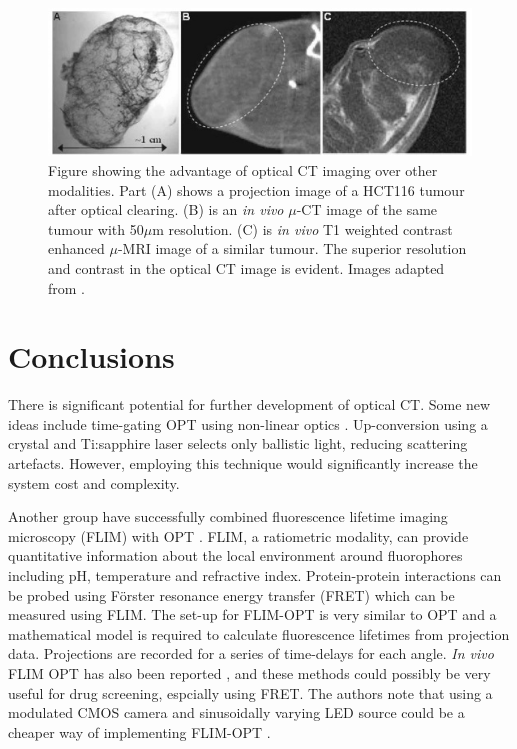 	
	
	\begin{figure}[H]
		\centering
		\includegraphics[scale=1]{intro_img/Oldham_2006_tumourstaining.jpg}
		\caption{Figure showing the advantage of optical CT imaging over other modalities. Part (A) shows a projection image of a HCT116 tumour after optical clearing. (B) is an \textit{in vivo} $\mu$-CT image of the same tumour with 50$\mu$m resolution. (C) is \textit{in vivo} T1 weighted contrast enhanced $\mu$-MRI image of a similar tumour. The superior resolution and contrast in the optical CT image is evident. Images  adapted from \cite{Oldham:2006}.}
		\label{fig:tumourstaining}
	\end{figure}
	
	
	
	
	
	\newpage
	\section{Conclusions}
	
	There is significant potential for further development of optical CT. Some new ideas include time-gating OPT using non-linear optics \cite{Bassi:2010}. Up-conversion using a crystal and Ti:sapphire laser  selects only ballistic light,  reducing scattering artefacts. However, employing this technique would significantly increase the system cost and complexity.
	
	Another group have successfully combined fluorescence lifetime imaging microscopy (FLIM) 
	with OPT \cite{McGinty:2008ix}. FLIM, a ratiometric modality, can provide quantitative information about the local environment around fluorophores including pH, temperature and refractive index. Protein-protein interactions can be probed using F\"{o}rster  resonance energy transfer (FRET) which can be measured using FLIM.  The set-up for FLIM-OPT is very similar to OPT and  a mathematical model is required to calculate fluorescence lifetimes from projection data. Projections are recorded for a series of time-delays for each angle. \textit{In vivo} FLIM OPT has also been reported \cite{McGinty:2011vm}, and these methods could possibly be very useful for drug screening, espcially using FRET. The authors note that using a modulated CMOS camera and sinusoidally varying LED source could be a cheaper way of implementing FLIM-OPT \cite{McGinty:2011vm}.
	
